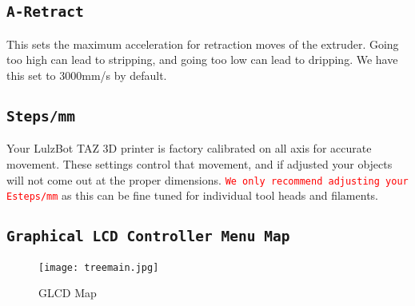\subsection{\texttt{A-Retract}} 
This sets the maximum acceleration for retraction moves of the extruder. Going too high can lead to stripping, and going too low can lead to dripping. We have this set to 3000mm/s\textsuperscript{} by default.

\subsection{\texttt{Steps/mm}}
Your LulzBot TAZ 3D printer is factory calibrated on all axis for accurate movement. These settings control that movement, and if adjusted your objects will not come out at the proper dimensions. \textcolor{red}{\texttt{We only recommend adjusting your Esteps/mm}} as this can be fine tuned for individual tool heads and filaments. 

\subsection{\texttt{Graphical LCD Controller Menu Map}}
\begin{figure}[H]
\centering
\texttt{[image: treemain.jpg]}
\caption{GLCD Map}
\label{fig:GLCD_Map}
\end{figure}




